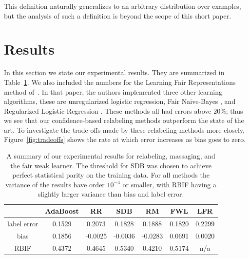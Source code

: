 \documentclass{article}
\begin{document}
This definition naturally generalizes to an arbitrary distribution over
examples, but the analysis of such a definition is beyond the scope of this
short paper.

\section{Results} \label{sec:results}

In this section we state our experimental results. They are summarized in
Table~\ref{table:results}. We also included the numbers for the Learning Fair
Representations method of~\citet{ZemelWSPD13}. In that paper, the authors
implemented three other learning algorithms, these are unregularized logistic
regression, Fair Naive-Bayes \citep{KamiranC09}, and Regularized Logistic
Regression \citep{KamashimaAS11}. These methods all had errors above $20\%$;
thus we see that our confidence-based relabeling methods outperform the state of
the art.  To investigate the trade-offs made by these relabeling methods more
closely, Figure~\ref{fig:tradeoffs} shows the rate at which error increases as
bias goes to zero.

\begin{table}
\centering
\begin{tabular}{| c | cccccc |}
\hline
               & AdaBoost & RR    & SDB  & RM   & FWL  & LFR \cite{ZemelWSPD13} \\
\hline 
label error    & 0.1529 & 0.2073 & 0.1828 & 0.1888 & 0.1820 & 0.2299 \\ 
bias           & 0.1856 &-0.0025 &-0.0036 &-0.0283 & 0.0691 & 0.0020 \\ 
RBIF           & 0.4372 & 0.4645 & 0.5340 & 0.4210 & 0.5174 & n/a \\ 
\hline 
\hline 
\end{tabular}
\caption{A summary of our experimental results for relabeling, massaging, and
the fair weak learner. The threshold for SDB was chosen to achieve perfect
statistical parity on the training data. For all methods the variance of the
results have order $10^{-4}$ or smaller, with RBIF having a slightly larger
variance than bias and label error.}
\label{table:results}
\end{table}
\end{document}
